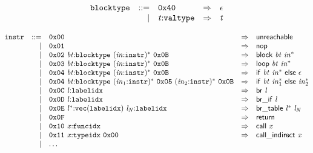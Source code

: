 \vspace{1ex}

\vspace{1ex}

$$
\begin{array}{@{}l@{}rrlll@{}l@{}}
& {\mathtt{blocktype}} &::=& \mathtt{0x40} &\Rightarrow& \epsilon \\ &&|&
{\mathit{t}}{:}{\mathtt{valtype}} &\Rightarrow& {\mathit{t}} \\
\end{array}
$$

\vspace{1ex}

$$
\begin{array}{@{}l@{}rrlll@{}l@{}}
& {\mathtt{instr}} &::=& \mathtt{0x00} &\Rightarrow& \mathsf{unreachable} \\ &&|&
\mathtt{0x01} &\Rightarrow& \mathsf{nop} \\ &&|&
\mathtt{0x02}~{\mathit{bt}}{:}{\mathtt{blocktype}}~{({\mathit{in}}{:}{\mathtt{instr}})^\ast}~\mathtt{0x0B} &\Rightarrow& \mathsf{block}~{\mathit{bt}}~{{\mathit{in}}^\ast} \\ &&|&
\mathtt{0x03}~{\mathit{bt}}{:}{\mathtt{blocktype}}~{({\mathit{in}}{:}{\mathtt{instr}})^\ast}~\mathtt{0x0B} &\Rightarrow& \mathsf{loop}~{\mathit{bt}}~{{\mathit{in}}^\ast} \\ &&|&
\mathtt{0x04}~{\mathit{bt}}{:}{\mathtt{blocktype}}~{({\mathit{in}}{:}{\mathtt{instr}})^\ast}~\mathtt{0x0B} &\Rightarrow& \mathsf{if}~{\mathit{bt}}~{{\mathit{in}}^\ast}~\mathsf{else}~\epsilon \\ &&|&
\mathtt{0x04}~{\mathit{bt}}{:}{\mathtt{blocktype}}~{({\mathit{in}}_{{1}}{:}{\mathtt{instr}})^\ast}~\mathtt{0x05}~{({\mathit{in}}_{{2}}{:}{\mathtt{instr}})^\ast}~\mathtt{0x0B} &\Rightarrow& \mathsf{if}~{\mathit{bt}}~{{\mathit{in}}_{{1}}^\ast}~\mathsf{else}~{{\mathit{in}}_{{2}}^\ast} \\ &&|&
\mathtt{0x0C}~{\mathit{l}}{:}{\mathtt{labelidx}} &\Rightarrow& \mathsf{br}~{\mathit{l}} \\ &&|&
\mathtt{0x0D}~{\mathit{l}}{:}{\mathtt{labelidx}} &\Rightarrow& \mathsf{br\_if}~{\mathit{l}} \\ &&|&
\mathtt{0x0E}~{{\mathit{l}}^\ast}{:}{\mathtt{vec}}({\mathtt{labelidx}})~{\mathit{l}}_{{\mathit{N}}}{:}{\mathtt{labelidx}} &\Rightarrow& \mathsf{br\_table}~{{\mathit{l}}^\ast}~{\mathit{l}}_{{\mathit{N}}} \\ &&|&
\mathtt{0x0F} &\Rightarrow& \mathsf{return} \\ &&|&
\mathtt{0x10}~{\mathit{x}}{:}{\mathtt{funcidx}} &\Rightarrow& \mathsf{call}~{\mathit{x}} \\ &&|&
\mathtt{0x11}~{\mathit{x}}{:}{\mathtt{typeidx}}~\mathtt{0x00} &\Rightarrow& \mathsf{call\_indirect}~{\mathit{x}} \\ &&|&
\dots \\
\end{array}
$$


